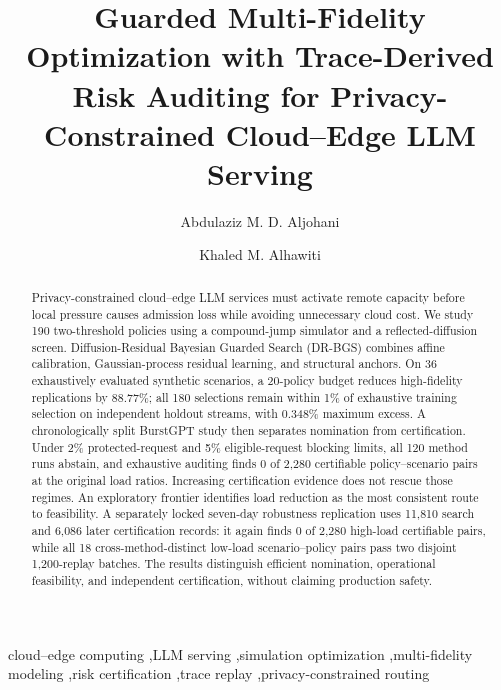 \documentclass[preprint,12pt]{elsarticle}
\begin{document}
\begin{frontmatter}

\title{Guarded Multi-Fidelity Optimization with Trace-Derived Risk Auditing for Privacy-Constrained Cloud--Edge LLM Serving}

\author[utabuk]{Abdulaziz M. D. Aljohani}
\author[utabuk]{Khaled M. Alhawiti}


\begin{abstract}
Privacy-constrained cloud--edge LLM services must activate remote capacity before local pressure causes admission loss while avoiding unnecessary cloud cost. We study 190 two-threshold policies using a compound-jump simulator and a reflected-diffusion screen. Diffusion-Residual Bayesian Guarded Search (DR-BGS) combines affine calibration, Gaussian-process residual learning, and structural anchors. On 36 exhaustively evaluated synthetic scenarios, a 20-policy budget reduces high-fidelity replications by 88.77\%; all 180 selections remain within 1\% of exhaustive training selection on independent holdout streams, with 0.348\% maximum excess. A chronologically split BurstGPT study then separates nomination from certification. Under 2\% protected-request and 5\% eligible-request blocking limits, all 120 method runs abstain, and exhaustive auditing finds 0 of 2,280 certifiable policy--scenario pairs at the original load ratios. Increasing certification evidence does not rescue those regimes. An exploratory frontier identifies load reduction as the most consistent route to feasibility. A separately locked seven-day robustness replication uses 11,810 search and 6,086 later certification records: it again finds 0 of 2,280 high-load certifiable pairs, while all 18 cross-method-distinct low-load scenario--policy pairs pass two disjoint 1,200-replay batches. The results distinguish efficient nomination, operational feasibility, and independent certification, without claiming production safety.
\end{abstract}

\begin{keyword}
cloud--edge computing \sep LLM serving \sep simulation optimization \sep multi-fidelity modeling \sep risk certification \sep trace replay \sep privacy-constrained routing
\end{keyword}

\end{frontmatter}
\end{document}
